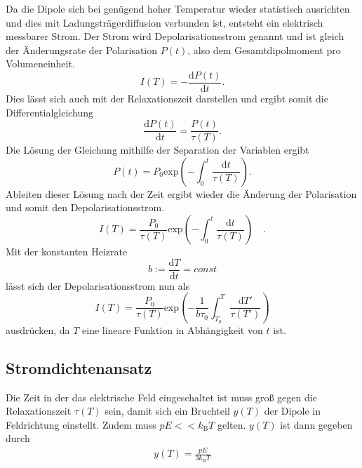 Da die Dipole sich bei genügend hoher Temperatur wieder statistisch ausrichten und dies mit Ladungsträgerdiffusion verbunden ist,
entsteht ein elektrisch messbarer Strom.
Der Strom wird Depolarisationsstrom genannt und ist gleich der Änderungsrate der 
Polarisation $P(t)$, also dem Gesamtdipolmoment pro Volumeneinheit.
\begin{equation}
    I(T) = - \frac{\text{d}P(t)}{\text{d}t}.
\end{equation}
Dies lässt sich auch mit der Relaxationszeit darstellen und ergibt somit die Differentialgleichung
\begin{equation}
    \frac{\text{d} P(t)}{\text{d} t} = \frac{P(t)}{\tau(T)}.
    \label{eqn:diff}
\end{equation}
Die Lösung der Gleichung mithilfe der Separation der Variablen ergibt
\begin{equation}
    P(t) = P_0 \text{exp}\left(-\int_0^t\frac{\text{d}t}{\tau(T)}\right).
\end{equation}
Ableiten dieser Lösung nach der Zeit ergibt wieder die Änderung der Polarisation und somit den 
Depolarisationsstrom.
\begin{equation}
    I(T) = \frac{P_0}{\tau(T)} \text{exp}\left(-\int_0^t\frac{\text{d}t}{\tau(T)}\right) \quad.
    \end{equation}
Mit der konstanten Heizrate
\begin{equation}
    b := \frac{\text{d}T}{\text{d}t} = const
\end{equation}
lässt sich der Depolarisationsstrom nun als 
\begin{equation}
    I(T) = \frac{P_0}{\tau(T)} \text{exp}\left(-\frac{1}{b\tau_0}\int_{T_0}^T\frac{\text{d}T'}{\tau(T')}\right)
\end{equation}
ausdrücken, da $T$ eine lineare Funktion in Abhängigkeit von $t$ ist.

\subsection{Stromdichtenansatz}
\label{subsec:Stromdichte}

Die Zeit in der das elektrische Feld eingeschaltet ist muss groß gegen die Relaxationszeit $\tau(T)$ sein, 
damit sich ein Bruchteil $y(T)$ der Dipole in Feldrichtung einstellt.
Zudem muss $pE << k_\text{B}T$ gelten.
$y(T)$ ist dann gegeben durch
\begin{align*}
    y(T)= \frac{pE}{3 k_\text{B}T}
\end{align*}

